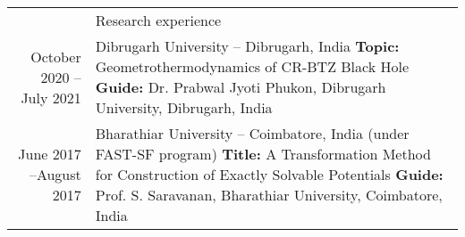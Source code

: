 \documentclass[a4paper, 11pt]{article}
\newcommand{\headingfont}{\Large\color{Peach}}
\newenvironment{SectionTable}[1]{
	\renewcommand*{\arraystretch}{1.7}
	\setlength{\tabcolsep}{10pt}
	\begin{longtable}{Rp{5.2in}} & #1 \\}
{\end{longtable}\vspace{-.3cm}}
\begin{document}







\begin{SectionTable}{\headingfont Research experience}
October 2020 --July 2021 &
Dibrugarh University -- Dibrugarh, India \newline
\textbf{Topic:} Geometrothermodynamics of CR-BTZ Black Hole \newline
\textbf{Guide:} Dr. Prabwal Jyoti Phukon, Dibrugarh University, Dibrugarh, India  \\

June 2017 --August 2017 &
Bharathiar University -- Coimbatore, India (under FAST-SF program) \newline
\textbf{Title:} A Transformation Method for Construction of Exactly Solvable Potentials \newline
\textbf{Guide:} Prof. S. Saravanan, Bharathiar University, Coimbatore, India
\\
\end{SectionTable}













\end{document}

